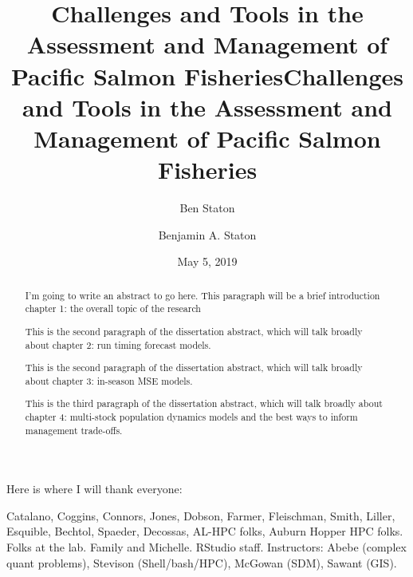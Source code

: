 \documentclass[12pt,]{book}
\title{Challenges and Tools in the Assessment and Management of Pacific Salmon
Fisheries}
\author{Ben Staton}
\date{}
\title{Challenges and Tools in the Assessment and Management of Pacific Salmon Fisheries}
\author{Benjamin A. Staton}
\date{May 5, 2019} %
\theoremstyle{definition}
\theoremstyle{definition}
\theoremstyle{definition}
\theoremstyle{remark}
\begin{document}
\maketitle

\begin{romanpages}      %

\TitlePage 

\doublespacing
\setlength{\parskip}{0pt plus 0pt minus 0pt}

\begin{abstract} 
\noindent
I'm going to write an abstract to go here. This paragraph will be a brief introduction chapter 1: the overall topic of the research

This is the second paragraph of the dissertation abstract, which will talk broadly about chapter 2: run timing forecast models.

This is the second paragraph of the dissertation abstract, which will talk broadly about chapter 3: in-season MSE models.

This is the third paragraph of the dissertation abstract, which will talk broadly about chapter 4: multi-stock population dynamics models and the best ways to inform management trade-offs. 

\end{abstract}

\begin{acknowledgments}
\noindent
Here is where I will thank everyone:

Catalano, Coggins, Connors, Jones, Dobson, Farmer, Fleischman, Smith, Liller, Esquible, Bechtol, Spaeder, Decossas, AL-HPC folks, Auburn Hopper HPC folks. Folks at the lab. Family and Michelle. RStudio staff. Instructors: Abebe (complex quant problems), Stevison (Shell/bash/HPC), McGowan (SDM), Sawant (GIS).  

\end{acknowledgments}

\begin{singlespace}
	\tableofcontents
	\clearpage
	\listoffigures
	\clearpage
	\listoftables
\end{singlespace}

\end{romanpages}        %

\normalem       %

\end{document}

